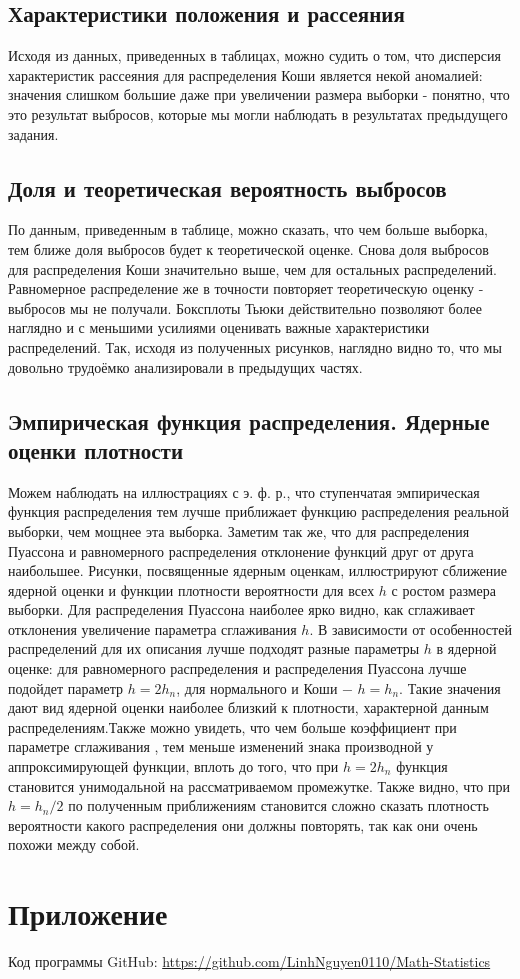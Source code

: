 \documentclass[a4paper]{article}
\begin{document}
\subsection{Характеристики положения и рассеяния}
\noindent Исходя из данных, приведенных в таблицах, можно судить о том, что дисперсия характеристик рассеяния для распределения Коши является некой аномалией: значения слишком большие даже при увеличении размера выборки - понятно, что это результат выбросов, которые мы могли наблюдать в результатах предыдущего задания.
\subsection{Доля и теоретическая вероятность выбросов}
\noindent По данным, приведенным в таблице, можно сказать, что чем больше выборка, тем ближе доля выбросов будет к теоретической оценке. Снова доля
выбросов для распределения Коши значительно выше, чем для остальных распределений. Равномерное распределение же в точности повторяет теоретическую оценку - выбросов мы не получали. \newline Боксплоты Тьюки действительно позволяют более наглядно и с меньшими усилиями оценивать важные характеристики распределений. Так, исходя из полученных рисунков, наглядно видно то, что мы довольно трудоёмко анализировали в предыдущих частях.
\subsection{Эмпирическая функция распределения. Ядерные оценки плотности}
\noindent Можем наблюдать на иллюстрациях с э. ф. р., что ступенчатая эмпирическая функция распределения тем лучше приближает функцию распределения реальной выборки, чем мощнее эта выборка. Заметим так же, что для распределения Пуассона и равномерного распределения отклонение функций друг от друга наибольшее. \newline Рисунки, посвященные ядерным оценкам, иллюстрируют сближение ядерной оценки и функции плотности вероятности для всех $h$ с ростом размера выборки. Для распределения Пуассона наиболее ярко видно, как сглаживает отклонения увеличение параметра сглаживания $h$. \newline В зависимости от особенностей распределений для их описания лучше подходят разные параметры $h$ в ядерной оценке: для равномерного распределения и распределения Пуассона лучше подойдет параметр $h = 2h_n$, для нормального и Коши − $h = h_n$. Такие значения дают вид ядерной оценки наиболее близкий к плотности, характерной данным распределениям.\newline Также можно увидеть, что чем больше коэффициент при параметре сглаживания , тем меньше изменений знака производной у аппроксимирующей функции, вплоть до того, что при $h = 2h_n$ функция становится унимодальной на рассматриваемом промежутке. Также видно, что при $h = h_n / 2$ по полученным приближениям становится сложно сказать плотность вероятности какого распределения они должны повторять, так как они очень
похожи между собой.
\section{Приложение}
\noindent Код программы GitHub: \url{https://github.com/LinhNguyen0110/Math-Statistics}
\end{document}
